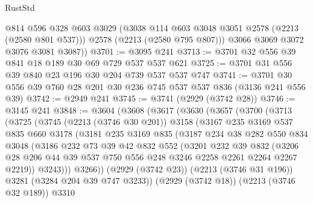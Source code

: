 \begin{lexlean}{RustStd}
\begin{coremodule}
          @814
          @596
          @328
          @603
          @3029
          (@3038 @114 @603 @3048 @3051 @2578 (@2213 (@2580 @801 @537)))
          @2578
          (@2213 (@2580 @795 @807)))
        @3066
        @3069
        @3072
        @3076
        @3081
        @3087))
@3701 := @3095 @241
@3713 := @3701 @32 @556 @39 @841 @18 @189 @30 @69 @729 @537 @537 @621
@3725 := @3701 @31 @556 @39 @840 @23 @196 @30 @204 @739 @537 @537 @747
@3741 := @3701 @30 @556 @39 @760 @28 @201 @30 @236 @745 @537 @537 @836 (@3136 @241 @556 @39)
@3742 := @2949 @241
@3745 := @3741 (@2929 (@3742 @28))
@3746 := @3145 @241
@3848 := @3604
    (@3608
      (@3617
        (@3630
          (@3657
            (@3700
              (@3713
                (@3725
                  (@3745
                    (@2213 (@3746 @30 @201))
                    @3158
                    (@3167
                      @235
                      @3169
                      @537
                      @835
                      @660
                      @3178
                      (@3181
                        @235
                        @3169
                        @835
                        (@3187
                          @234
                          @38
                          @282
                          @550
                          @834
                          @3048
                          (@3186
                            @232
                            @73
                            @39
                            @42
                            @832
                            @552
                            (@3201
                              @232
                              @39
                              @832
                              (@3206
                                @28
                                @206
                                @44
                                @39
                                @537
                                @750
                                @556
                                @248
                                @3246
                                @2258
                                @2261
                                @2264
                                @2267
                                @2219))
                            @3243)))
                      @3266))
                  (@2929 (@3742 @23))
                  (@2213 (@3746 @31 @196))
                  @3281
                  (@3284 @204 @39 @747 @3233))
                (@2929 (@3742 @18))
                (@2213 (@3746 @32 @189))
                @3310

\end{coremodule}
\end{lexlean}

